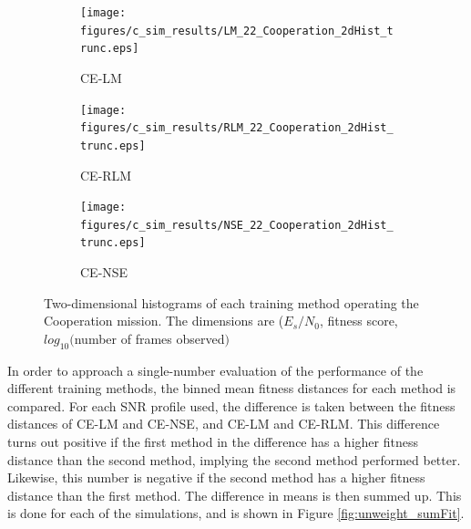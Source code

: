 \begin{figure}[ht]
\begin{subfigure}{0.30\linewidth}
	\centering
	\texttt{[image: figures/c\_sim\_results/LM\_22\_Cooperation\_2dHist\_trunc.eps]}
	\caption{CE-LM}
	\label{fig:cSim2dHist_LM}
\end{subfigure}\hfill%
\begin{subfigure}{0.30\linewidth}
	\centering
	\texttt{[image: figures/c\_sim\_results/RLM\_22\_Cooperation\_2dHist\_trunc.eps]}
	\caption{CE-RLM}
	\label{fig:cSim2dHist_RLM}
\end{subfigure}\hfill%
\begin{subfigure}{0.30\linewidth}
	\centering
	\texttt{[image: figures/c\_sim\_results/NSE\_22\_Cooperation\_2dHist\_trunc.eps]}
	\caption{CE-NSE}
	\label{fig:cSim2dHist_NSE}
\end{subfigure}
\caption{Two-dimensional histograms of each training method operating the Cooperation mission. The dimensions are ($E_s/N_0$, fitness score, $log_10($number of frames observed$)$} \label{fig:cSimBin2dHist}
\end{figure}

\par In order to approach a single-number evaluation of the performance of the different training methods, the binned mean fitness distances for each method is compared. For each SNR profile used, the difference is taken between the fitness distances of CE-LM and CE-NSE, and CE-LM and CE-RLM. This difference turns out positive if the first method in the difference has a higher fitness distance than the second method, implying the second method performed better. Likewise, this number is negative if the second method has a higher fitness distance than the first method. The difference in means is then summed up. This is done for each of the simulations, and is shown in Figure \ref{fig:unweight_sumFit}.

